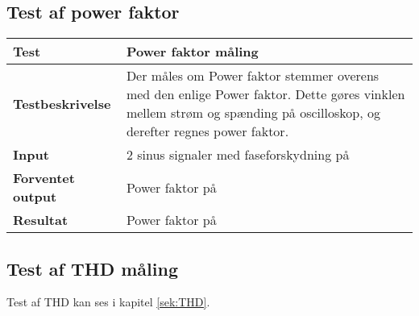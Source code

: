 \subsection*{Test af power faktor}
\begin{center}
	\begin{tabular}{ | m{} | m{}|} 
		\hline
		\textbf{Test}					&Power faktor måling \\ \hline
		\textbf{Testbeskrivelse}		&Der måles om Power faktor stemmer overens med den enlige Power faktor. Dette gøres vinklen mellem strøm og spænding på oscilloskop, og derefter regnes power faktor.   \\ \hline
		\textbf{Input}					&2 sinus signaler med faseforskydning på \\ \hline
		\textbf{Forventet output}		&Power faktor på \\ \hline
		\textbf{Resultat}				&Power faktor på \\ \hline
	\end{tabular}
\end{center}   


\subsection*{Test af THD måling}
Test af THD kan ses i kapitel \ref{sek:THD}. 